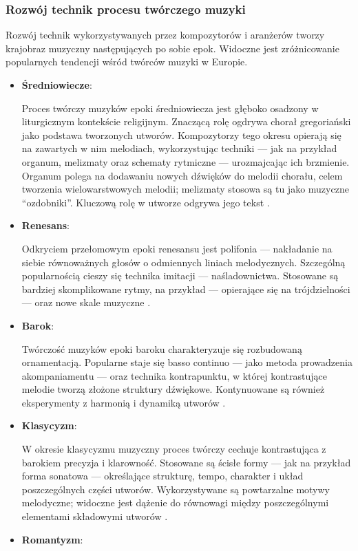 \subsubsection{Rozwój technik procesu twórczego muzyki}
Rozwój technik wykorzystywanych przez kompozytorów i aranżerów tworzy krajobraz muzyczny następujących po sobie epok.
Widoczne jest zróżnicowanie popularnych tendencji wśród twórców muzyki w Europie.
\begin{itemize}
	\item \textbf{Średniowiecze}:

	      Proces twórczy muzyków epoki średniowiecza jest głęboko osadzony w liturgicznym kontekście religijnym.
	      Znaczącą rolę ogdrywa chorał gregoriański jako podstawa tworzonych utworów.
	      Kompozytorzy tego okresu opierają się na zawartych w nim melodiach, wykorzystując techniki — jak na przykład organum,
	      melizmaty oraz schematy rytmiczne — urozmajcając ich brzmienie.
	      Organum polega na dodawaniu nowych dźwięków do melodii chorału, celem tworzenia wielowarstwowych melodii;
	      melizmaty stosowa są tu jako muzyczne \enquote{ozdobniki}. Kluczową rolę w utworze odgrywa jego tekst \cite{abc}.
	\item \textbf{Renesans}:

	      Odkryciem przełomowym epoki renesansu jest polifonia — nakładanie na siebie równoważnych głosów o
	      odmiennych liniach melodycznych.
	      Szczególną popularnością cieszy się technika imitacji — naśladownictwa.
	      Stosowane są bardziej skomplikowane rytmy, na przykład — opierające się na trójdzielności — oraz nowe
	      skale muzyczne \cite{atlas1}.
	\item \textbf{Barok}:

	      Twórczość muzyków epoki baroku charakteryzuje się rozbudowaną ornamentacją.
	      Popularne staje się basso continuo — jako metoda prowadzenia akompaniamentu — oraz technika kontrapunktu,
	      w której kontrastujące melodie tworzą złożone struktury dźwiękowe.
	      Kontynuowane są również eksperymenty z harmonią i dynamiką utworów \cite{estetyka}.
	\item \textbf{Klasycyzm}:

	      W okresie klasycyzmu muzyczny proces twórczy cechuje kontrastująca z barokiem precyzja i klarowność.
	      Stosowane są ścisłe formy — jak na przykład forma sonatowa — określające strukturę, tempo,
	      charakter i układ poszczególnych części utworów.
	      Wykorzystywane są powtarzalne motywy melodyczne;
	      widoczne jest dążenie do równowagi między poszczególnymi elementami składowymi utworów \cite{abc}.
	\item \textbf{Romantyzm}:


\end{itemize}
